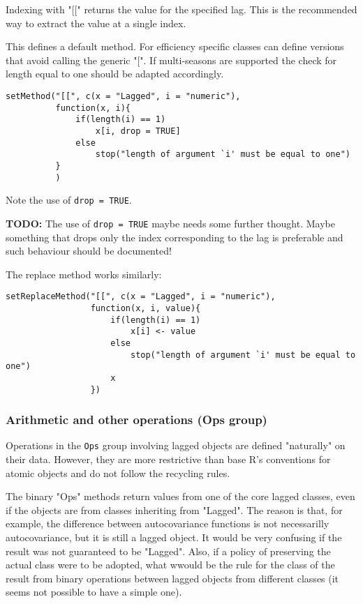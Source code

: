 \documentclass[11pt,a4paper]{article}
\begin{document}
Indexing with "[[" returns the value for the specified lag. This is the recommended way to
extract the value at a single index.

This defines a default method. For efficiency specific classes can define versions that avoid
calling the generic "[". If multi-seasons are supported the check for length equal to one
should be adapted accordingly.
\begin{verbatim}
setMethod("[[", c(x = "Lagged", i = "numeric"),
          function(x, i){
              if(length(i) == 1)
                  x[i, drop = TRUE]
              else
                  stop("length of argument `i' must be equal to one")
          }
          )

\end{verbatim}
Note the use of \texttt{drop = TRUE}.

\textbf{TODO:} The use of \texttt{drop = TRUE} maybe needs some further thought. Maybe something that drops
only the index corresponding to the lag is preferable and such behaviour should be documented!

The replace method works similarly:
\begin{verbatim}
setReplaceMethod("[[", c(x = "Lagged", i = "numeric"),
                 function(x, i, value){
                     if(length(i) == 1)
                         x[i] <- value
                     else
                         stop("length of argument `i' must be equal to one")
                     x
                 })
\end{verbatim}



\subsubsection{Arithmetic and other operations (Ops group)}
\label{sec:org2aa0dd7}

Operations in the \texttt{Ops} group involving lagged objects are defined "naturally" on their
data. However, they are more restrictive than base R's conventions for atomic objects and do
not follow the recycling rules.

The binary "Ops" methods return values from one of the core lagged classes, even if the
objects are from classes inheriting from "Lagged". The reason is that, for example, the
difference between autocovariance functions is not necessarilly autocovariance, but it is
still a lagged object. It would be very confusing if the result was not guaranteed to be
"Lagged".  Also, if a policy of preserving the actual class were to be adopted, what wwould
be the rule for the class of the result from binary operations between lagged objects from
different classes (it seems not possible to have a simple one). 
\end{document}
